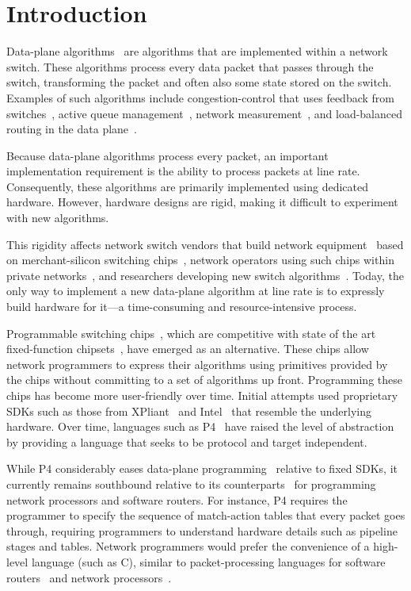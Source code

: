 \section{Introduction}
\label{s:intro}

Data-plane algorithms~\cite{cestan} are algorithms that are implemented within
a network switch. These algorithms process every data packet that passes
through the switch, transforming the packet and often also some state stored on
the switch.  Examples of such algorithms include congestion-control that uses
feedback from switches~\cite{xcp, rcp, pdq, dctcp}, active queue
management~\cite{codel}, network measurement~\cite{opensketch, bitmap_george,
elephant_george}, and load-balanced routing in the data plane~\cite{conga}.

Because data-plane algorithms process every packet, an important implementation
requirement is the ability to process packets at line rate.  Consequently,
these algorithms are primarily implemented using dedicated hardware. However,
hardware designs are rigid, making it difficult to experiment with new
algorithms.

This rigidity affects network switch vendors that build network
equipment~\cite{cisco_nexus, dell_force10, arista_7050} based on
merchant-silicon switching chips~\cite{trident, tomahawk, mellanox}, network
operators using such chips within private networks~\cite{google,facebook,vl2},
and researchers developing new switch algorithms~\cite{xcp, codel, d3, detail,
pdq}. Today, the only way to implement a new data-plane algorithm at line rate
is to expressly build hardware for it---a time-consuming and resource-intensive
process.

Programmable switching chips~\cite{flexpipe, xpliant, rmt}, which are competitive
with state of the art fixed-function chipsets~\cite{trident, tomahawk,
mellanox}, have emerged as an alternative.  These chips allow network programmers to
express their algorithms using primitives provided by the chips without
committing to a set of algorithms up front. Programming these
chips has become more user-friendly over time. Initial attempts
used proprietary SDKs such as those from XPliant~\cite{xpliant_sdk,
xpliant_sdk2} and Intel~\cite{intel_sdk} that resemble the underlying hardware.
Over time, languages such as P4~\cite{p4, p4spec} have raised the level of
abstraction by providing a language that seeks to be protocol and target independent.

While P4 considerably eases data-plane programming~\cite{dc_p4} relative to
fixed SDKs, it currently remains southbound relative to its
counterparts~\cite{packetc, nova, click} for programming network processors and
software routers. For instance, P4 requires the programmer to specify the
sequence of match-action tables that every packet goes through, requiring
programmers to understand hardware details such as pipeline stages and
tables. Network programmers would prefer the convenience of a high-level
language (such as C), similar to packet-processing languages for software
routers~\cite{click} and network processors~\cite{ixp4xx, ixp2800}.


